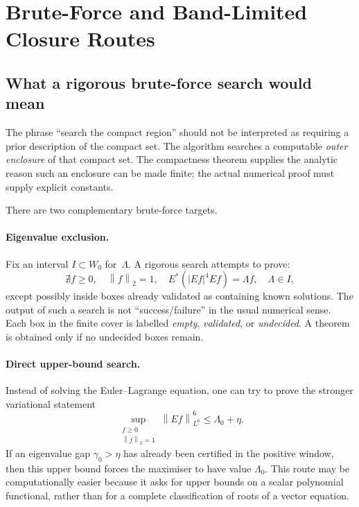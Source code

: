 \documentclass[12pt]{article}
\theoremstyle{definition}
\theoremstyle{remark}
\newcommand{\norm}[1]{\left\|#1\right\|}
\begin{document}
\section{Brute-Force and Band-Limited Closure Routes}
\label{sec:revisit-bruteforce-bandlimited}

\subsection{What a rigorous brute-force search would mean}
\label{sec:bruteforce-search}

The phrase ``search the compact region'' should not be interpreted as
requiring a prior description of the compact set.  The algorithm searches
a computable \emph{outer enclosure} of that compact set.  The compactness
theorem supplies the analytic reason such an enclosure can be made finite;
the actual numerical proof must supply explicit constants.

There are two complementary brute-force targets.

\paragraph{Eigenvalue exclusion.}
Fix an interval $I\subset W_0$ for~$\Lambda$.  A rigorous search attempts
to prove:
\[
  \nexists f\geq0,\quad \norm{f}_2=1,\quad
  E^*(|Ef|^4Ef)=\Lambda f,\quad \Lambda\in I,
\]
except possibly inside boxes already validated as containing known
solutions.  The output of such a search is not ``success/failure'' in the
usual numerical sense.  Each box in the finite cover is labelled
\emph{empty}, \emph{validated}, or \emph{undecided}.  A theorem is obtained
only if no undecided boxes remain.

\paragraph{Direct upper-bound search.}
Instead of solving the Euler--Lagrange equation, one can try to prove the
stronger variational statement
\[
  \sup_{\substack{f\geq0\\ \norm{f}_2=1}}
  \norm{Ef}_{L^6}^6
  \leq \Lambda_0+\eta.
\]
If an eigenvalue gap $\gamma_0>\eta$ has already been certified in the
positive window, then this upper bound forces the maximiser to have value
$\Lambda_0$.  This route may be computationally easier because it asks for
upper bounds on a scalar polynomial functional, rather than for a complete
classification of roots of a vector equation.
\end{document}
